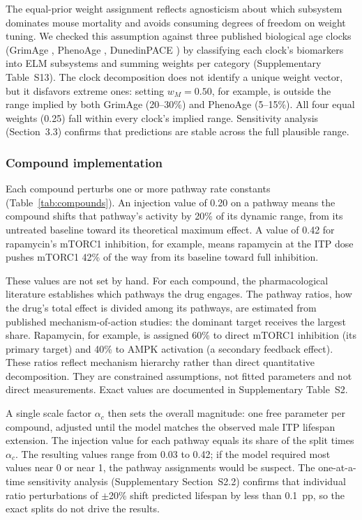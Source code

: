 \documentclass[11pt]{article}
\begin{document}
The equal-prior weight assignment reflects agnosticism about which subsystem dominates mouse mortality and avoids consuming degrees of freedom on weight tuning. We checked this assumption against three published biological age clocks (GrimAge \citep{Lu2019}, PhenoAge \citep{Levine2018}, DunedinPACE \citep{Belsky2022}) by classifying each clock's biomarkers into ELM subsystems and summing weights per category (Supplementary Table~S13). The clock decomposition does not identify a unique weight vector, but it disfavors extreme ones: setting $w_M = 0.50$, for example, is outside the range implied by both GrimAge (20--30\%) and PhenoAge (5--15\%). All four equal weights (0.25) fall within every clock's implied range. Sensitivity analysis (Section~3.3) confirms that predictions are stable across the full plausible range.

\subsubsection{Compound implementation}

Each compound perturbs one or more pathway rate constants (Table~\ref{tab:compounds}). An injection value of 0.20 on a pathway means the compound shifts that pathway's activity by 20\% of its dynamic range, from its untreated baseline toward its theoretical maximum effect. A value of 0.42 for rapamycin's mTORC1 inhibition, for example, means rapamycin at the ITP dose pushes mTORC1 42\% of the way from its baseline toward full inhibition.

These values are not set by hand. For each compound, the pharmacological literature establishes which pathways the drug engages. The pathway ratios, how the drug's total effect is divided among its pathways, are estimated from published mechanism-of-action studies: the dominant target receives the largest share. Rapamycin, for example, is assigned 60\% to direct mTORC1 inhibition (its primary target) and 40\% to AMPK activation (a secondary feedback effect). These ratios reflect mechanism hierarchy rather than direct quantitative decomposition. They are constrained assumptions, not fitted parameters and not direct measurements. Exact values are documented in Supplementary Table~S2.

A single scale factor $\alpha_c$ then sets the overall magnitude: one free parameter per compound, adjusted until the model matches the observed male ITP lifespan extension. The injection value for each pathway equals its share of the split times $\alpha_c$. The resulting values range from 0.03 to 0.42; if the model required most values near 0 or near 1, the pathway assignments would be suspect. The one-at-a-time sensitivity analysis (Supplementary Section~S2.2) confirms that individual ratio perturbations of $\pm$20\% shift predicted lifespan by less than 0.1~pp, so the exact splits do not drive the results.
\end{document}
